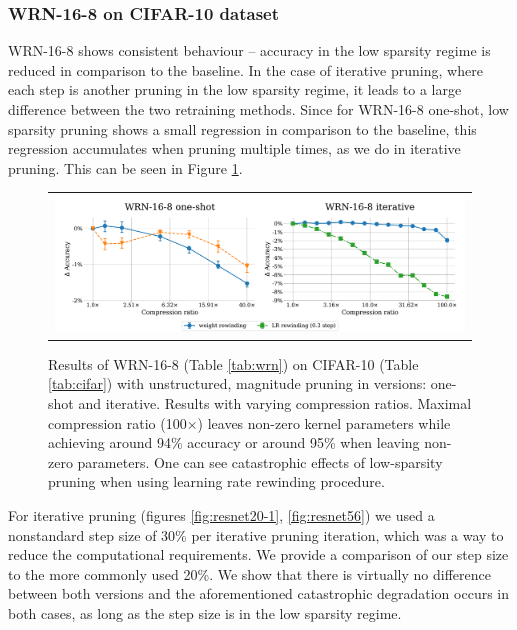 \subsubsection{WRN-16-8 on CIFAR-10 dataset}
\nopagebreak

WRN-16-8 shows consistent behaviour -- accuracy in the low sparsity regime is reduced in comparison to the baseline. In the case of iterative pruning, where each step is another pruning in the low sparsity regime, it leads to a large difference between the two retraining methods. Since for WRN-16-8 one-shot, low sparsity pruning shows a small regression in comparison to the baseline, this regression accumulates when pruning multiple times, as we do in iterative pruning. This can be seen in Figure \ref{fig:wrn-1}.

\begin{figure}[H]
\setlength{\tabcolsep}{0pt}
  \begin{center}
    \begin{tabular}{c}
      \includegraphics[width=1.0\linewidth]{pics/WRN-16-8-LR-rewinding-is-flawed.pdf}\\
    \end{tabular}
  \end{center}
\caption{Results of WRN-16-8 (Table \ref{tab:wrn}) on CIFAR-10 (Table \ref{tab:cifar}) with unstructured, magnitude pruning in versions: one-shot and iterative. Results with varying compression ratios. Maximal compression ratio (100$\times$) leaves  non-zero kernel parameters while achieving around 94\% accuracy or around 95\% when leaving  non-zero parameters. One can see catastrophic effects of low-sparsity pruning when using learning rate rewinding procedure.}
\label{fig:wrn-1}
\end{figure}

For iterative pruning (figures \ref{fig:resnet20-1}, \ref{fig:resnet56}) we used a nonstandard step size of 30\% per iterative pruning iteration, which was a way to reduce the computational requirements. We provide a comparison of our step size to the more commonly used 20\%. We show that there is virtually no difference between both versions and the aforementioned catastrophic degradation occurs in both cases, as long as the step size is in the low sparsity regime.

